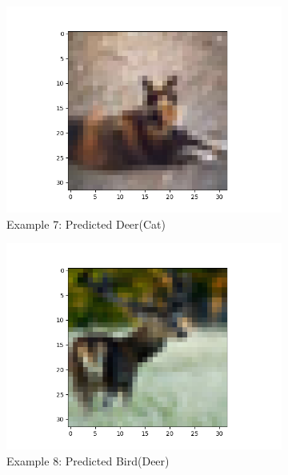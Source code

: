 \documentclass[11pt]{article}
\begin{document}
\begin{figure}[H]
\begin{subfigure}[b]{0.3\textwidth}
        \includegraphics[width=\linewidth]{misA7.png}
        \caption{Example 7: Predicted Deer(Cat)}
    \end{subfigure}
    \hfill
    \begin{subfigure}[b]{0.3\textwidth}
        \centering
        \includegraphics[width=\linewidth]{misA8.png}
        \caption{Example 8: Predicted Bird(Deer)}
    \end{subfigure} 
    \hfill
    \begin{subfigure}[b]{0.3\textwidth}
        \centering

\end{subfigure}
\end{figure}
\end{document}
